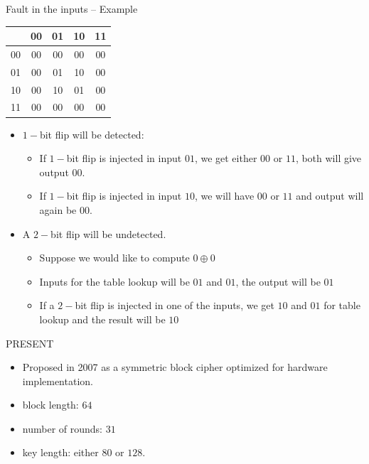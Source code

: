 \begin{frame}{Fault in the inputs -- Example}
    \begin{example}
        \begin{table}[htb]
    \centering
    \begin{tabular}{c|c|c|c|c}
          &  00  &  01  & 10  & 11\\\hline
      00  &  00  &  00  & 00  & 00\\
      01  &  00  &  01  & 10   & 00 \\
      10  &  00  &  10  & 01  & 00 \\
      11  &  00  &  00  & 00  & 00 
    \end{tabular}
\end{table}
\begin{itemize}
    \item $1-$bit flip will be detected:
    \begin{itemize}
        \item If $1-$bit flip is injected in input $01$, we get either $00$ or $11$, both will give output $00$.
        \item If $1-$bit flip is injected in input $10$, we will have $00$ or $11$ and output will again be $00$.
    \end{itemize}
    \item A $2-$bit flip will be undetected.
    \begin{itemize}
        \item Suppose we would like to compute $0\oplus 0$
        \item Inputs for the table lookup will be $01$ and $01$, the output will be $01$
        \item If a $2-$bit flip is injected in one of the inputs, we get $10$ and $01$ for table lookup and the result will be $10$
    \end{itemize}
\end{itemize}
    \end{example}
\end{frame}

\begin{frame}{PRESENT}
    \begin{itemize}
        \item Proposed in 2007 as a symmetric block cipher optimized for hardware implementation.
       \item block length: $64$
       \item number of rounds: $31$
       \item key length: either $80$ or $128$.
    \end{itemize}
\end{frame}

